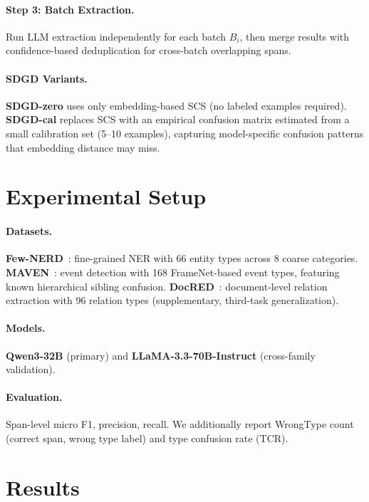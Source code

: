 \documentclass[11pt,a4paper]{article}
\begin{document}
\paragraph{Step 3: Batch Extraction.}
Run LLM extraction independently for each batch $B_i$, then merge results with confidence-based deduplication for cross-batch overlapping spans.

\paragraph{SDGD Variants.}
\textbf{SDGD-zero} uses only embedding-based SCS (no labeled examples required).
\textbf{SDGD-cal} replaces SCS with an empirical confusion matrix estimated from a small calibration set (5--10 examples), capturing model-specific confusion patterns that embedding distance may miss.

\section{Experimental Setup}
\label{sec:setup}

\paragraph{Datasets.}
\textbf{Few-NERD}~\cite{}: fine-grained NER with 66 entity types across 8 coarse categories.
\textbf{MAVEN}~\cite{}: event detection with 168 FrameNet-based event types, featuring known hierarchical sibling confusion.
\textbf{DocRED}~\cite{}: document-level relation extraction with 96 relation types (supplementary, third-task generalization).

\paragraph{Models.}
\textbf{Qwen3-32B} (primary) and \textbf{LLaMA-3.3-70B-Instruct} (cross-family validation).

\paragraph{Evaluation.}
Span-level micro F1, precision, recall.
We additionally report WrongType count (correct span, wrong type label) and type confusion rate (TCR).

\section{Results}
\label{sec:results}
\end{document}
